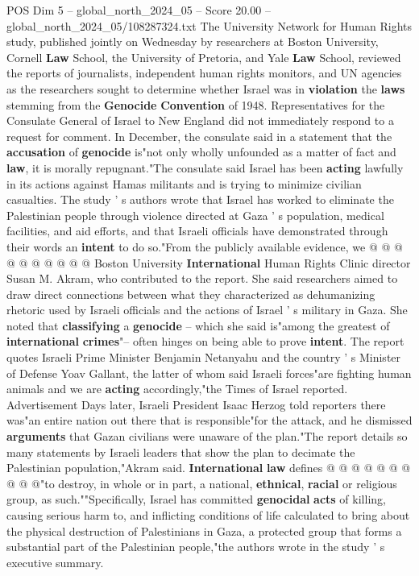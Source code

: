 \begin{textsample}{POS Dim 5 – global\_north\_2024\_05 – Score 20.00 – global\_north\_2024\_05/108287324.txt}  \label{ex:f5_pos_172}
The University Network for Human Rights study, published jointly on Wednesday by researchers at Boston University, Cornell \textbf{Law} School, the University of Pretoria, and Yale \textbf{Law} School, reviewed the reports of journalists, independent human rights monitors, and UN agencies as the researchers sought to determine whether Israel was in \textbf{violation} the \textbf{laws} stemming from the \textbf{Genocide} \textbf{Convention} of 1948.
Representatives for the Consulate General of Israel to New England did not immediately respond to a request for comment.
In December, the consulate said in a statement that the \textbf{accusation} of \textbf{genocide} is"not only wholly unfounded as a matter of fact and \textbf{law}, it is morally repugnant."The consulate said Israel has been \textbf{acting} lawfully in its actions against Hamas militants and is trying to minimize civilian casualties.
The study ' s authors wrote that Israel has worked to eliminate the Palestinian people through violence directed at Gaza ' s population, medical facilities, and aid efforts, and that Israeli officials have demonstrated through their words an \textbf{intent} to do so."From the publicly available evidence, we @ @ @ @ @ @ @ @ @ @ Boston University \textbf{International} Human Rights Clinic director Susan M.
Akram, who contributed to the report.
She said researchers aimed to draw direct connections between what they characterized as dehumanizing rhetoric used by Israeli officials and the actions of Israel ' s military in Gaza.
She noted that \textbf{classifying} a \textbf{genocide} -- which she said is"among the greatest of \textbf{international} \textbf{crimes}"-- often hinges on being able to prove \textbf{intent}.
The report quotes Israeli Prime Minister Benjamin Netanyahu and the country ' s Minister of Defense Yoav Gallant, the latter of whom said Israeli forces"are fighting human animals and we are \textbf{acting} accordingly,"the Times of Israel reported.
Advertisement Days later, Israeli President Isaac Herzog told reporters there was"an entire nation out there that is responsible"for the attack, and he dismissed \textbf{arguments} that Gazan civilians were unaware of the plan."The report details so many statements by Israeli leaders that show the plan to decimate the Palestinian population,"Akram said. \textbf{International} \textbf{law} defines @ @ @ @ @ @ @ @ @ @"to destroy, in whole or in part, a national, \textbf{ethnical}, \textbf{racial} or religious group, as such.""Specifically, Israel has committed \textbf{genocidal} \textbf{acts} of killing, causing serious harm to, and inflicting conditions of life calculated to bring about the physical destruction of Palestinians in Gaza, a protected group that forms a substantial part of the Palestinian people,"the authors wrote in the study ' s executive summary.

\end{textsample}
